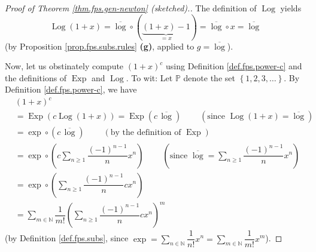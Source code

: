 \begin{proof}
[Proof of Theorem \ref{thm.fps.gen-newton} (sketched).]The definition of
$\operatorname*{Log}$ yields
\[
\operatorname*{Log}\left(  1+x\right)  =\overline{\log}\circ\left(
\underbrace{\left(  1+x\right)  -1}_{=x}\right)  =\overline{\log}\circ
x=\overline{\log}%
\]
(by Proposition \ref{prop.fps.subs.rules} \textbf{(g)}, applied to
$g=\overline{\log}$).

Now, let us obstinately compute $\left(  1+x\right)  ^{c}$ using Definition
\ref{def.fps.power-c} and the definitions of $\operatorname*{Exp}$ and
$\operatorname*{Log}$. To wit: Let $\mathbb{P}$ denote the set $\left\{
1,2,3,\ldots\right\}  $. By Definition \ref{def.fps.power-c}, we have%
\begin{align}
&  \left(  1+x\right)  ^{c}\nonumber\\
&  =\operatorname*{Exp}\left(  c\operatorname*{Log}\left(  1+x\right)
\right)  =\operatorname*{Exp}\left(  c\,\overline{\log}\right)
\ \ \ \ \ \ \ \ \ \ \left(  \text{since }\operatorname*{Log}\left(
1+x\right)  =\overline{\log}\right) \nonumber\\
&  =\exp\circ\left(  c\,\overline{\log}\right)  \ \ \ \ \ \ \ \ \ \ \left(
\text{by the definition of }\operatorname*{Exp}\right) \nonumber\\
&  =\exp\circ\left(  c\sum_{n\geq1}\dfrac{\left(  -1\right)  ^{n-1}}{n}%
x^{n}\right)  \ \ \ \ \ \ \ \ \ \ \left(  \text{since }\overline{\log}%
=\sum_{n\geq1}\dfrac{\left(  -1\right)  ^{n-1}}{n}x^{n}\right) \nonumber\\
&  =\exp\circ\left(  \sum_{n\geq1}\dfrac{\left(  -1\right)  ^{n-1}}{n}%
cx^{n}\right) \nonumber\\
&  =\sum_{m\in\mathbb{N}}\dfrac{1}{m!}\left(  \sum_{n\geq1}\dfrac{\left(
-1\right)  ^{n-1}}{n}cx^{n}\right)  ^{m} \label{pf.thm.fps.gen-newton.1}%
\end{align}
(by Definition \ref{def.fps.subs}, since $\exp=\sum_{n\in\mathbb{N}}\dfrac
{1}{n!}x^{n}=\sum_{m\in\mathbb{N}}\dfrac{1}{m!}x^{m}$).


\end{proof}
